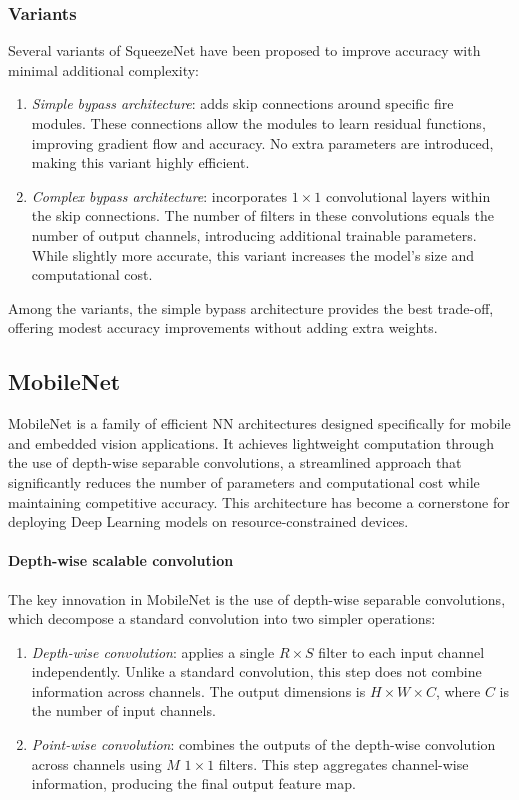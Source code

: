 \subsubsection{Variants}
Several variants of SqueezeNet have been proposed to improve accuracy with minimal additional complexity:
\begin{enumerate}
    \item \textit{Simple bypass architecture}: adds skip connections around specific fire modules.
        These connections allow the modules to learn residual functions, improving gradient flow and accuracy.
        No extra parameters are introduced, making this variant highly efficient.
    \item \textit{Complex bypass architecture}: incorporates $1 \times 1$ convolutional layers within the skip connections.
        The number of filters in these convolutions equals the number of output channels, introducing additional trainable parameters.
        While slightly more accurate, this variant increases the model's size and computational cost.
\end{enumerate}
\noindent Among the variants, the simple bypass architecture provides the best trade-off, offering modest accuracy improvements without adding extra weights.

\subsection{MobileNet}
MobileNet is a family of efficient NN architectures designed specifically for mobile and embedded vision applications.
It achieves lightweight computation through the use of depth-wise separable convolutions, a streamlined approach that significantly reduces the number of parameters and computational cost while maintaining competitive accuracy.
This architecture has become a cornerstone for deploying Deep Learning models on resource-constrained devices.

\paragraph*{Depth-wise scalable convolution}
The key innovation in MobileNet is the use of depth-wise separable convolutions, which decompose a standard convolution into two simpler operations:
\begin{enumerate}
    \item \textit{Depth-wise convolution}: applies a single $R\times S$ filter to each input channel independently.
        Unlike a standard convolution, this step does not combine information across channels.
        The output dimensions is $H\times W\times C$, where $C$ is the number of input channels.
    \item \textit{Point-wise convolution}: combines the outputs of the depth-wise convolution across channels using $M$ $1\times 1$ filters.
        This step aggregates channel-wise information, producing the final output feature map.
\end{enumerate}

